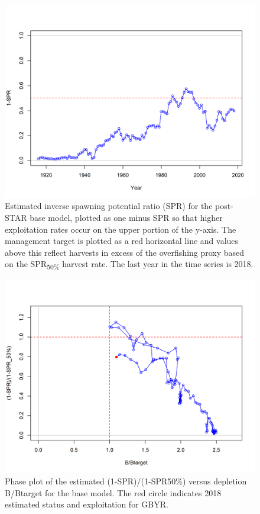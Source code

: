 \documentclass[12pt,]{article}
\begin{document}
\FloatBarrier

\begin{figure}
\centering
\includegraphics{r4ss/plots_mod1/SPR2_minusSPRseries.png}
\caption{Estimated inverse spawning potential ratio (SPR) for the
post-STAR base model, plotted as one minus SPR so that higher
exploitation rates occur on the upper portion of the y-axis. The
management target is plotted as a red horizontal line and values above
this reflect harvests in excess of the overfishing proxy based on the
SPR\textsubscript{50\%} harvest rate. The last year in the time series
is 2018. \label{fig:SPR_all}}
\end{figure}

\begin{figure}
\centering
\includegraphics{r4ss/plots_mod1/SPR4_phase}
\caption{Phase plot of the estimated (1-SPR)/(1-SPR50\%) versus
depletion B/Btarget for the base model. The red circle indicates 2018
estimated status and exploitation for GBYR. \label{fig:SPR_phase}}
\end{figure}
\end{document}
